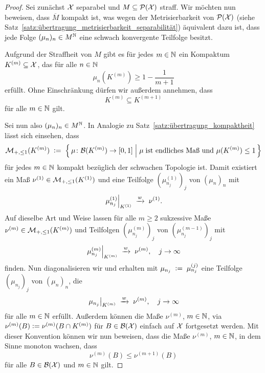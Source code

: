 \documentclass[../thesis/thesis.tex]{subfiles}
\begin{document}
	\begin{proof}
		Sei zunächst $\mathcal{X}$ separabel und $M \subseteq \mathcal{P}(\mathcal{X})$ straff. Wir möchten nun beweisen, dass $\overline{M}$ 
		kompakt ist, was wegen der Metrisierbarkeit von $\mathcal{P}(\mathcal{X})$ (siehe Satz~\ref{satz:übertragung_metrisierbarkeit_separabilität}) äquivalent dazu ist,
		dass jede Folge $(\mu_n)_n \in M^{\mathbb{N}}$ eine schwach konvergente Teilfolge besitzt. 
		
		Aufgrund der Straffheit von $M$ gibt es für jedes $m \in \mathbb{N}$ ein Kompaktum $K^{(m)} \subseteq \mathcal{X}$, 
		das für alle $n \in \mathbb{N}$
		\[ \mu_n(K^{(m)}) \geq 1 - \frac{1}{m+1} \label{glg:5.2} \tag{5.2} \]
		erfüllt. Ohne Einschränkung dürfen wir außerdem annehmen, dass 
		\[ K^{(m)} \subseteq K^{(m+1)} \label{glg:5.3} \tag{5.3} \] 
		für alle $m \in \mathbb{N}$ gilt.
		
		Sei nun also $(\mu_n)_n \in M^{\mathbb{N}}$.
		In Analogie zu Satz~\ref{satz:übertragung_kompaktheit} lässt sich einsehen, dass 
		\[ \mathcal{M}_{+,\leq 1}(K^{(m)}) \; \vcentcolon = \; \left\{\, \mu \colon \mathcal{B}(K^{(m)}) \to [0,1] \; \middle| \; \mu \; 
			\text{ist endliches Maß und } \mu(K^{(m)}) \leq 1 \,\right\} \]
		für jedes $m \in \mathbb{N}$ kompakt bezüglich der schwachen Topologie ist. Damit existiert ein Maß 
		$\nu^{(1)} \in \mathcal{M}_{+,\leq 1}(K^{(1)})$ und eine Teilfolge $(\mu_{n_j}^{(1)})_j$ von $(\mu_n)_n$ mit
		\[ \left.\mu_{n_j}^{(1)}\right|_{K^{(1)}} \; \xrightarrow{w} \; \nu^{(1)} \text{.} \]
		Auf dieselbe Art und Weise lassen für alle $m\geq 2$ sukzessive Maße 
		$\nu^{(m)} \in \mathcal{M}_{+,\leq 1}(K^{(m)})$ und Teilfolgen $(\mu_{n_j}^{(m)})_j$ von $(\mu_{n_j}^{(m-1)})_j$ mit
		\[ \left.\mu_{n_j}^{(m)}\right|_{K^{(m)}} \; \xrightarrow{w} \; \nu^{(m)}, \quad j \to \infty \]
		finden.
		Nun diagonalisieren wir und erhalten mit $\mu_{n_j} \; \vcentcolon = \; \mu_{n_j}^{(j)}$ eine Teilfolge 
		$(\mu_{n_j})_j$ von $(\mu_n)_n$, die
		\[ \left.\mu_{n_j}\right|_{K^{(m)}} \; \xrightarrow{w} \; \nu^{(m)}, \quad j \to \infty \]
		für alle $m \in \mathbb{N}$ erfüllt.
		Außerdem können die Maße $\nu^{(m)}$, $m \in \mathbb{N}$, via 
		$\nu^{(m)}(B) \vcentcolon = \nu^{(m)}(B \cap K^{(m)})$ für $B \in \mathcal{B}(\mathcal{X})$ einfach auf $\mathcal{X}$ fortgesetzt werden. 
		Mit dieser Konvention können wir nun beweisen, dass die Maße
		$\nu^{(m)}$, $m \in \mathbb{N}$, in dem Sinne monoton wachsen, dass 
		\[ \nu^{(m)}(B) \leq \nu^{(m+1)}(B) \label{glg:5.4} \tag{5.4} \]
		für alle $B \in \mathcal{B}(\mathcal{X})$ und $m \in \mathbb{N}$ gilt.
		

\end{proof}
\end{document}

